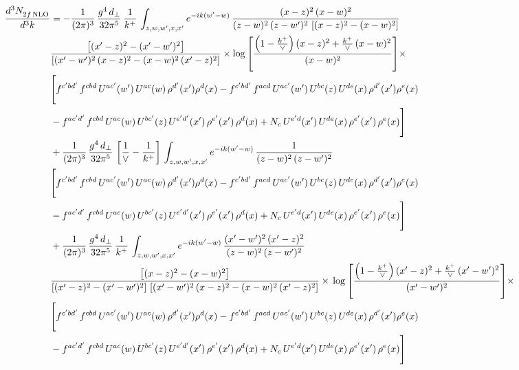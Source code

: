 \documentclass[10pt]{article}
\numberwithin{equation}{section}
\begin{document}
\begin{align}
    \frac{d^{3}N_{2f\,\rm NLO}^{\rm}}{d^{3}k}  & =   - \frac{1}{(2\pi)^{3}}\, \frac{g^{4}\,d_{\perp}}{32\pi^{5}}\,\frac{1}{k^{+}}\,\int_{z,w,w^{\prime},x,x'} e^{-ik(w^{\prime}-w)}\,\frac{(x-z)^{2}\, (x-w)^{2}}{(z-w)^{2}\, (z-w')^{2}\,\left[(x-z)^{2} - (x-w)^{2}\right]}\notag \\ & \frac{\left[(x'-z)^{2}-(x'-w')^{2}\right]}{\left[(x'-w')^{2}\, (x-z)^{2} - (x-w)^{2}\, (x'-z)^{2}\right]}\times \log{\left[\frac{\left(1-\frac{k^{+}}{\vee}\right)(x-z)^{2}+\frac{k^{+}}{\vee}\,(x-w)^{2}}{(x-w)^{2}}\right]}\times\notag \\ & \Bigg[f^{c'bd'}\,f^{cbd}\, U^{ac'}(w')\,U^{ac}(w)\,\rho^{d'}(x')\rho^{d}(x)- f^{c'bd'}\,f^{acd}\,U^{ac'}(w')\,U^{bc}(z)\,U^{de}(x)\,\rho^{d'}(x')\rho^{e}(x) \notag \\ & -f^{ac'd'}\,f^{cbd}\,U^{ac}(w)\,U^{bc'}(z)\,U^{e'd'}(x')\,\rho^{e'}(x')\,\rho^{d}(x) +N_{c}\,U^{e'd}(x')\,U^{de}(x)\,\rho^{e'}(x')\,\rho^{e}(x)\Bigg]  \notag \\
& + \frac{1}{(2\pi)^{3}}\, \frac{g^{4}\,d_{\perp}}{32\pi^{5}}\,\left[\frac{1}{\vee} - \frac{1}{k^{+}}\right]\,\int_{z,w,w^{\prime},x,x'} e^{-ik(w^{\prime}-w)}\,\frac{1}{(z-w)^{2}\, (z-w')^{2}}\notag \\ & \Bigg[f^{c'bd'}\,f^{cbd}\, U^{ac'}(w')\,U^{ac}(w)\,\rho^{d'}(x')\rho^{d}(x)- f^{c'bd'}\,f^{acd}\,U^{ac'}(w')\,U^{bc}(z)\,U^{de}(x)\,\rho^{d'}(x')\rho^{e}(x) \notag \\ & -f^{ac'd'}\,f^{cbd}\,U^{ac}(w)\,U^{bc'}(z)\,U^{e'd'}(x')\,\rho^{e'}(x')\,\rho^{d}(x) +N_{c}\,U^{e'd}(x')\,U^{de}(x)\,\rho^{e'}(x')\,\rho^{e}(x)\Bigg]  \notag \\
& + \frac{1}{(2\pi)^{3}}\, \frac{g^{4}\,d_{\perp}}{32\pi^{5}}\,\frac{1}{k^{+}}\,\int_{z,w,w^{\prime},x,x'} e^{-ik(w^{\prime}-w)}\,\frac{(x'-w')^{2}\, (x'-z)^{2}}{(z-w)^{2}\, (z-w')^{2}}\notag \\ & \frac{\left[(x-z)^{2} - (x-w)^{2}\right]}{\left[(x'-z)^{2} - (x'-w')^{2}\right]\, \left[(x'-w')^{2}\, (x - z)^{2} - (x-w)^{2}\,(x'-z)^{2}\right]}\times\, \log{\left[\frac{\left(1-\frac{k^{+}}{\vee}\right)(x'-z)^{2}+\frac{k^{+}}{\vee}\,(x'-w')^{2}}{(x'-w')^{2}}\right]}\times \notag \\ &  \Bigg[f^{c'bd'}\,f^{cbd}\, U^{ac'}(w')\,U^{ac}(w)\,\rho^{d'}(x')\rho^{d}(x)- f^{c'bd'}\,f^{acd}\,U^{ac'}(w')\,U^{bc}(z)\,U^{de}(x)\,\rho^{d'}(x')\rho^{e}(x) \notag \\ & -f^{ac'd'}\,f^{cbd}\,U^{ac}(w)\,U^{bc'}(z)\,U^{e'd'}(x')\,\rho^{e'}(x')\,\rho^{d}(x) +N_{c}\,U^{e'd}(x')\,U^{de}(x)\,\rho^{e'}(x')\,\rho^{e}(x)\Bigg]
\end{align}
\end{document}
